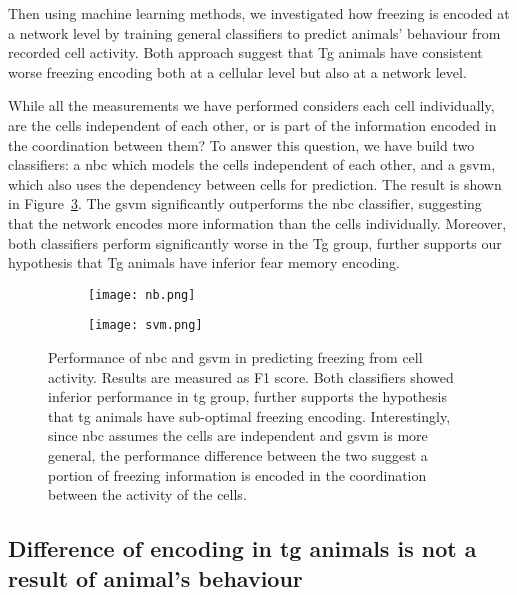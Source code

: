 Then using machine learning methods, we investigated how freezing is encoded at a network level by training general classifiers to predict animals' behaviour from recorded cell activity. Both approach suggest that Tg animals have consistent worse freezing encoding both at a cellular level but also at a network level. 

While all the measurements we have performed considers each cell individually, are the cells independent of each other, or is part of the information encoded in the coordination between them? To answer this question, we have build two classifiers: a \gls{nbc} which models the cells independent of each other, and a \gls{gsvm}, which also uses the dependency between cells for prediction. The result is shown in Figure~\ref{f.ad.classifier}. The \gls{gsvm} significantly outperforms the \gls{nbc} classifier, suggesting that the network encodes more information than the cells individually. Moreover, both classifiers perform significantly worse in the Tg group, further supports our hypothesis that Tg animals have inferior fear memory encoding.
\begin{figure}[h]
    \begin{subfigure}[h]{\textwidth}
        \texttt{[image: nb.png]}
        \caption{\label{f.ad.nb}}
    \end{subfigure}
    \begin{subfigure}[h]{\textwidth}
        \texttt{[image: svm.png]}
        \caption{\label{f.ad.svm}}
    \end{subfigure}
    \caption{Performance of  \gls{nbc} and  \gls{gsvm} in predicting freezing from cell activity. Results are measured as F1 score. Both classifiers showed inferior performance in \gls{tg} group, further supports the hypothesis that \gls{tg} animals have sub-optimal freezing encoding. Interestingly, since \gls{nbc} assumes the cells are independent and \gls{gsvm} is more general, the performance difference between the two suggest a portion of freezing information is encoded in the coordination between the activity of the cells. \label{f.ad.classifier}}
\end{figure}




\subsection{Difference of encoding in \gls{tg} animals is not a result of animal's behaviour}

